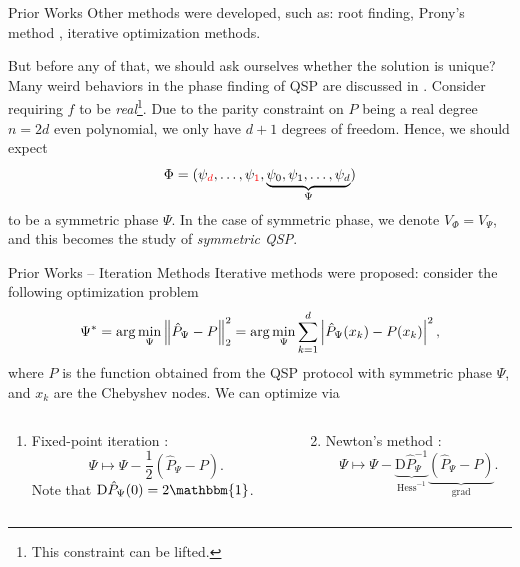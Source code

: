 \begin{frame}{Prior Works}
    Other methods were developed, such as: root finding, Prony's method \cite{Prony}, iterative optimization methods.
    
    But before any of that, we should ask ourselves whether the solution is unique? Many weird behaviors in the phase finding of QSP are discussed in \cite{EnergyLandscpae}. Consider requiring $f$ to be \textit{\color{red}real}\footnote{This constraint can be lifted.\vspace{2.5ex}}. Due to the parity constraint on $P$ being a real degree $n=2d$ even polynomial, we only have $d+1$ degrees of freedom. Hence, we should expect
    \begin{equation}
        \Phi= (\psi_{\color{red}d},\ldots,\psi_{\color{red}1},\underbrace{\psi_0,\psi_1,\ldots,\psi_d}_{\Psi})
    \end{equation}
    to be a symmetric phase $\Psi$. In the case of symmetric phase, we denote $V_\Phi=V_\Psi$, and this becomes the study of \textit{symmetric QSP}.
\end{frame}

\begin{frame}{Prior Works -- Iteration Methods}
    Iterative methods were proposed: consider the following optimization problem
    \begin{equation}
        \Psi^* = \arg\min_\Psi \left\lVert{\hat{P}_\Psi - P}\right\rVert_2^2 = \arg\min_\Psi \sum_{k=1}^{d} \left|{\hat{P}_\Psi(x_k) - P(x_k)}\right|^2,
    \end{equation}
    where $P$ is the function obtained from the QSP protocol with symmetric phase $\Psi$, and $x_k$ are the Chebyshev nodes. We can optimize via
    \begin{columns}
    \begin{column}{0.45\textwidth}
        \begin{enumerate}
            \item Fixed-point iteration \cite{FPI}:
            \begin{equation*}
                \Psi \mapsto \Psi - \frac{1}{2}(\hat{P}_\Psi - P).
            \end{equation*}
            Note that $\mathrm{D}\hat{P}_\Psi(0) = 2\mathbbm{1}$.
        \end{enumerate}
    \end{column}
    \begin{column}{0.45\textwidth}
        \begin{enumerate}
            \setcounter{enumi}{1}
            \item Newton's method \cite{Newton}:
            \begin{equation*}
                \Psi \mapsto \Psi - \underbrace{\mathrm{D}\hat{P}_\Psi^{-1}}_{\mathrm{Hess}^{-1}}\underbrace{(\hat{P}_\Psi-P)}_{\mathrm{grad}}.
            \end{equation*}
            \vspace{0.2em}
        \end{enumerate}
    \end{column}
    \end{columns}
\end{frame}

